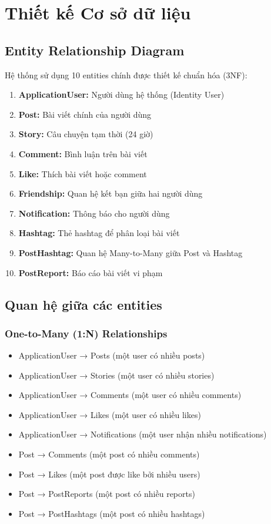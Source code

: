 \section{Thiết kế Cơ sở dữ liệu}

\subsection{Entity Relationship Diagram}
Hệ thống sử dụng 10 entities chính được thiết kế chuẩn hóa (3NF):

\begin{enumerate}
    \item \textbf{ApplicationUser:} Người dùng hệ thống (Identity User)
    \item \textbf{Post:} Bài viết chính của người dùng
    \item \textbf{Story:} Câu chuyện tạm thời (24 giờ)
    \item \textbf{Comment:} Bình luận trên bài viết
    \item \textbf{Like:} Thích bài viết hoặc comment
    \item \textbf{Friendship:} Quan hệ kết bạn giữa hai người dùng
    \item \textbf{Notification:} Thông báo cho người dùng
    \item \textbf{Hashtag:} Thẻ hashtag để phân loại bài viết
    \item \textbf{PostHashtag:} Quan hệ Many-to-Many giữa Post và Hashtag
    \item \textbf{PostReport:} Báo cáo bài viết vi phạm
\end{enumerate}

\subsection{Quan hệ giữa các entities}

\subsubsection{One-to-Many (1:N) Relationships}
\begin{itemize}
    \item ApplicationUser → Posts (một user có nhiều posts)
    \item ApplicationUser → Stories (một user có nhiều stories)
    \item ApplicationUser → Comments (một user có nhiều comments)
    \item ApplicationUser → Likes (một user có nhiều likes)
    \item ApplicationUser → Notifications (một user nhận nhiều notifications)
    \item Post → Comments (một post có nhiều comments)
    \item Post → Likes (một post được like bởi nhiều users)
    \item Post → PostReports (một post có nhiều reports)
    \item Post → PostHashtags (một post có nhiều hashtags)
\end{itemize}

